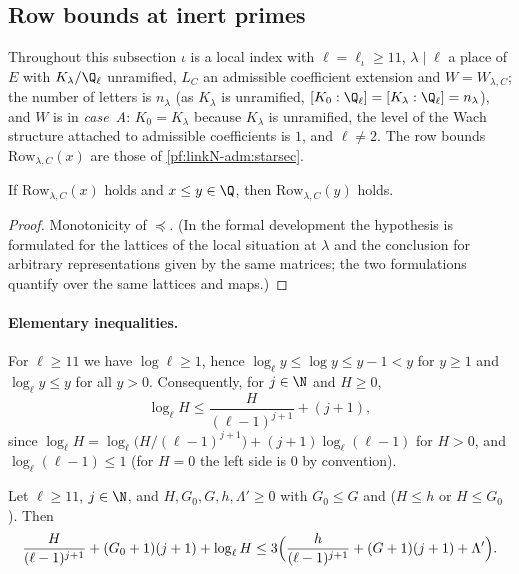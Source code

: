 \subsection{Row bounds at inert primes}\label{pf:linkN-adm:rows}

Throughout this subsection $\iota$ is a local index with $\ell=\ell_\iota\ge11$, $\lambda\mid\ell$ a place of $E$ with
$K_\lambda/\Q_\ell$ unramified, $L_C$ an admissible coefficient extension and $W=W_{\lambda,C}$; the number of letters is
$n_\lambda$ (as $K_\lambda$ is unramified, $[K_0:\Q_\ell]=[K_\lambda:\Q_\ell]=n_\lambda$), and $W$ is in \emph{case~A}:
$K_0=K_\lambda$ because $K_\lambda$ is unramified, the level of the Wach structure attached to admissible coefficients is $1$,
and $\ell\ne2$. The row bounds $\mathrm{Row}_{\lambda,C}(x)$ are those of \cref{pf:linkN-adm:starsec}.

\begin{lemma}\label{pf:linkN-adm:rowat}
If $\mathrm{Row}_{\lambda,C}(x)$ holds and $x\le y\in\Q$, then $\mathrm{Row}_{\lambda,C}(y)$ holds.
\end{lemma}

\begin{proof}
Monotonicity of $\preceq$. (In the formal development the hypothesis is formulated for the lattices of the local
situation at $\lambda$ and the conclusion for arbitrary representations given by the same matrices; the two
formulations quantify over the same lattices and maps.)
\end{proof}

\paragraph{Elementary inequalities.} For $\ell\ge11$ we have $\log\ell\ge1$, hence $\log_\ell y\le\log y\le y-1<y$ for
$y\ge1$ and $\log_\ell y\le y$ for all $y>0$. Consequently, for $j\in\N$ and $H\ge0$,
\begin{equation}\label{pf:linkN-adm:eq-logsplit}
\log_\ell H\le\frac{H}{(\ell-1)^{j+1}}+(j+1),
\end{equation}
since $\log_\ell H=\log_\ell\bigl(H/(\ell-1)^{j+1}\bigr)+(j+1)\log_\ell(\ell-1)$ for $H>0$, and $\log_\ell(\ell-1)\le1$
(for $H=0$ the left side is $0$ by convention).

\begin{lemma}\label{pf:linkN-adm:bracket}
Let $\ell\ge11$, $j\in\N$, and $H,G_0,G,h,\Lambda'\ge0$ with $G_0\le G$ and ($H\le h$ or $H\le G_0$). Then
\[
\frac{H}{(\ell-1)^{j+1}}+(G_0+1)(j+1)+\log_\ell H\le3\Bigl(\frac{h}{(\ell-1)^{j+1}}+(G+1)(j+1)+\Lambda'\Bigr).
\]
\end{lemma}


